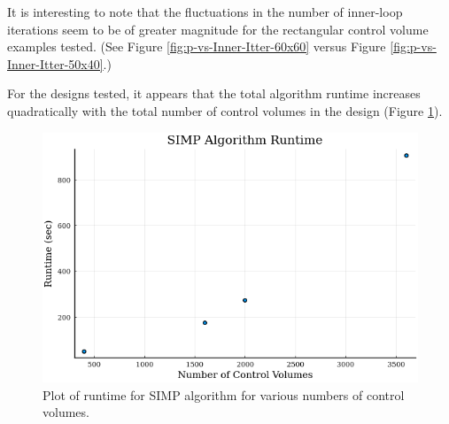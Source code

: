 It is interesting to note that the fluctuations in the number of inner-loop iterations seem to be of greater magnitude for the rectangular control volume examples tested. (See Figure \ref{fig:p-vs-Inner-Itter-60x60} versus Figure \ref{fig:p-vs-Inner-Itter-50x40}.)

For the designs tested, it appears that the total algorithm runtime increases quadratically with the total number of control volumes in the design (Figure \ref{fig:runtime}).

\begin{figure}
	\centering
	\includegraphics[width=0.8\linewidth]{Chapter_III_Implementation_and_Results/Images/SIMP-Runtime.png}
	\caption[SIMP Runtime Plot]{Plot of runtime for SIMP algorithm for various numbers of control volumes.}
	\label{fig:runtime}
\end{figure}